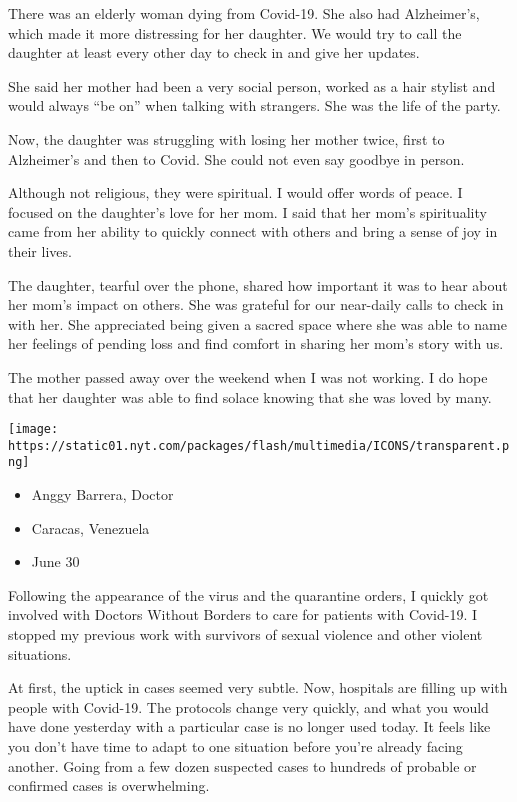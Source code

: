 There was an elderly woman dying from Covid-19. She also had
Alzheimer's, which made it more distressing for her daughter. We would
try to call the daughter at least every other day to check in and give
her updates.

She said her mother had been a very social person, worked as a hair
stylist and would always ``be on'' when talking with strangers. She was
the life of the party.

Now, the daughter was struggling with losing her mother twice, first to
Alzheimer's and then to Covid. She could not even say goodbye in person.

Although not religious, they were spiritual. I would offer words of
peace. I focused on the daughter's love for her mom. I said that her
mom's spirituality came from her ability to quickly connect with others
and bring a sense of joy in their lives.

The daughter, tearful over the phone, shared how important it was to
hear about her mom's impact on others. She was grateful for our
near-daily calls to check in with her. She appreciated being given a
sacred space where she was able to name her feelings of pending loss and
find comfort in sharing her mom's story with us.

The mother passed away over the weekend when I was not working. I do
hope that her daughter was able to find solace knowing that she was
loved by many.

\texttt{[image: https://static01.nyt.com/packages/flash/multimedia/ICONS/transparent.png]}

\begin{itemize}
\tightlist
\item
  Anggy Barrera, Doctor
\item
  Caracas, Venezuela
\item
  June 30
\end{itemize}

Following the appearance of the virus and the quarantine orders, I
quickly got involved with Doctors Without Borders to care for patients
with Covid-19. I stopped my previous work with survivors of sexual
violence and other violent situations.

At first, the uptick in cases seemed very subtle. Now, hospitals are
filling up with people with Covid-19. The protocols change very quickly,
and what you would have done yesterday with a particular case is no
longer used today. It feels like you don't have time to adapt to one
situation before you're already facing another. Going from a few dozen
suspected cases to hundreds of probable or confirmed cases is
overwhelming.

